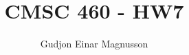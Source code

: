 \documentclass[12pt]{article}
\begin{document}
\title{CMSC 460 - HW7}
\author{Gudjon Einar Magnusson}

\maketitle

\section{}



\section{}

\section{}
\end{document}
